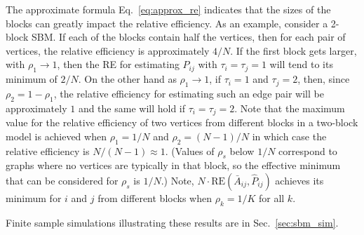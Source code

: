 \documentclass[journal,twoside,web]{ieeecolor}
\begin{document}
The approximate formula Eq.~\ref{eq:approx_re} indicates that the sizes of the blocks can greatly impact the relative efficiency.
As an example, consider a 2-block SBM.
If each of the blocks contain half the vertices, then for each pair of vertices, the relative efficiency is approximately $4/N$.
If the first block gets larger, with $\rho_1\to 1$, then the RE for estimating $P_{ij}$ with $\tau_i=\tau_j=1$ will tend to its minimum of $2/N$.
On the other hand as $\rho_1\to 1$, if $\tau_i=1$ and $\tau_j=2$, then, since $\rho_2=1-\rho_1$, the relative efficiency for estimating such an edge pair will be approximately $1$ and the same will hold if $\tau_i=\tau_j=2$.
Note that the maximum value for the relative efficiency of two vertices from different blocks in a two-block model is achieved when $\rho_1=1/N$ and $\rho_2=(N-1)/N$ in which case the relative efficiency is $N/(N-1) \approx 1$.
(Values of $\rho_s$ below $1/N$ correspond to graphs where no vertices are typically in that block, so the effective minimum that can be considered for $\rho_s$ is $1/N$.)
Note, $N \cdot \mathrm{RE}(\bar{A}_{ij}, \hat{P}_{ij})$ achieves its minimum for $i$ and $j$ from different blocks when $\rho_k = 1/K$ for all $k$.

Finite sample simulations illustrating these results are in Sec.~\ref{sec:sbm_sim}.

\end{document}
